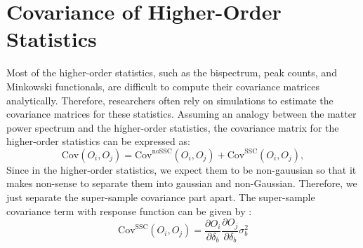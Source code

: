 \section{Covariance of Higher-Order Statistics}
Most of the higher-order statistics, such as the bispectrum, peak counts, and Minkowski functionals, are difficult to compute their covariance matrices analytically. Therefore, researchers often rely on simulations to estimate the covariance matrices for these statistics. Assuming an analogy between the matter power spectrum and the higher-order statistics, the covariance matrix for the higher-order statistics can be expressed as:
\begin{equation}
    \mathrm{Cov}(O_i, O_j) = \mathrm{Cov}^{\mathrm{noSSC}}(O_i, O_j) + \mathrm{Cov}^{\mathrm{SSC}}(O_i, O_j),
\end{equation}
Since in the higher-order statistics, we expect them to be non-gauusian so that it makes non-sense to separate them into gaussian and non-Gaussian. Therefore, we just separate the super-sample covariance part apart. The super-sample covariance term with response function can be given by \citep{2014PhRvD..89h3519L}:
\begin{equation}
    \mathrm{Cov}^{\mathrm{SSC}}(O_i, O_j) = \frac{\partial O_i}{\partial \delta_b} \frac{\partial O_j}{\partial \delta_b} \sigma_b^2
\end{equation}

\begin{comment}
\section{Fisher Forecast}
One main application of the covariance matrix is in the Fisher forecast, which estimates the precision of cosmological parameter constraints from weak lensing data. The Fisher matrix \( F_{\alpha \beta} \) is defined as:
\begin{equation}
    F_{\alpha \beta} = \sum_{i, j} \frac{\partial O_i}{\partial \theta_\alpha} \mathrm{Cov}^{-1}_{ij} \frac{\partial O_j}{\partial \theta_\beta},
\end{equation}
where \( O_i \) and \( O_j \) are the observables, and \( \theta_\alpha \) and \( \theta_\beta \) are the cosmological parameters. The inverse of the Fisher matrix provides the covariance matrix for the cosmological parameters:
\begin{equation}
    \mathrm{Cov}(\theta_\alpha, \theta_\beta) = F^{-1}_{\alpha \beta}.
\end{equation}
\end{comment}
